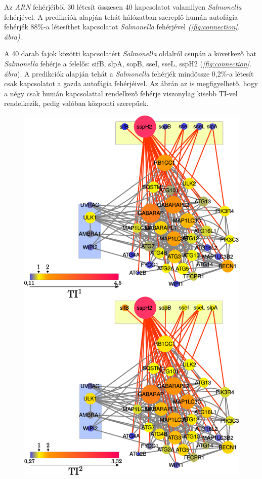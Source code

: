 \documentclass[a4paper,12pt]{article}
\begin{document}
		Az \textit{ARN} fehérjéiből 30 létesít összesen 40 kapcsolatot valamilyen \textit{Salmonella} fehérjével. A predikciók alapján tehát hálózatban szereplő humán autofágia fehérjék 88\%-a létesíthet kapcsolatot \textit{Salmonella} fehérjével \textit{(\ref{fig:connection}. ábra)}.
		
		 A 40 darab fajok közötti kapcsolatért \textit{Salmonella} oldalról csupán a következő hat \textit{Salmonella} fehérje a felelős: sifB, slpA, sopB, sseI, sseL, sspH2 (\textit{\ref{fig:connection}. ábra}). A predikciók alapján tehát a \textit{Salmonella} fehérjék mindössze 0,2\%-a létesít csak kapcsolatot a gazda autofágia fehérjéivel. Az ábrán az is megfigyelhető, hogy a négy csak humán kapcsolattal rendelkező fehérje viszonylag kisebb TI-vel rendelkezik, pedig valóban központi szerepűek.
		
				\begin{figure}[H]
					\includegraphics[scale=0.48]{img/connection_prots_v2_complete.pdf}

\end{figure}
\end{document}
